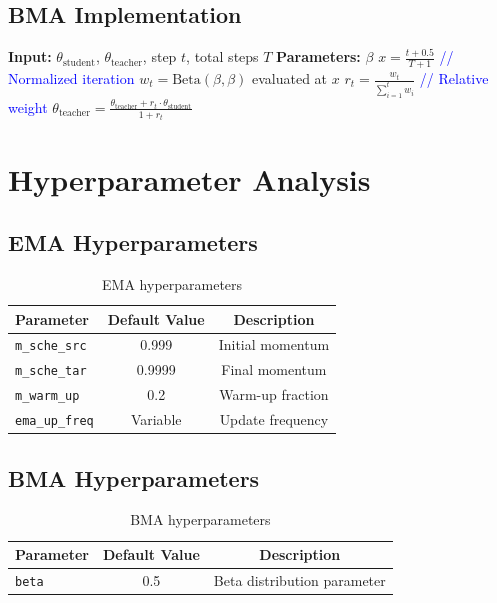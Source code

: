 \documentclass[11pt]{article}
\begin{document}
\subsection{BMA Implementation}

\begin{algorithm}
\caption{BMA Teacher Update}
\begin{algorithmic}[1]
\STATE \textbf{Input:} $\theta_{\text{student}}$, $\theta_{\text{teacher}}$, step $t$, total steps $T$
\STATE \textbf{Parameters:} $\beta$
\STATE 
\STATE $x = \frac{t + 0.5}{T + 1}$ \textcolor{blue}{// Normalized iteration}
\STATE $w_t = \text{Beta}(\beta, \beta)$ evaluated at $x$
\STATE $r_t = \frac{w_t}{\sum_{i=1}^{t} w_i}$ \textcolor{blue}{// Relative weight}
\STATE $\theta_{\text{teacher}} = \frac{\theta_{\text{teacher}} + r_t \cdot \theta_{\text{student}}}{1 + r_t}$
\end{algorithmic}
\end{algorithm}

\section{Hyperparameter Analysis}

\subsection{EMA Hyperparameters}

\begin{table}[h!]
\centering
\begin{tabular}{lcc}
\toprule
Parameter & Default Value & Description \\
\midrule
\texttt{m\_sche\_src} & 0.999 & Initial momentum \\
\texttt{m\_sche\_tar} & 0.9999 & Final momentum \\
\texttt{m\_warm\_up} & 0.2 & Warm-up fraction \\
\texttt{ema\_up\_freq} & Variable & Update frequency \\
\bottomrule
\end{tabular}
\caption{EMA hyperparameters}
\end{table}

\subsection{BMA Hyperparameters}

\begin{table}[h!]
\centering
\begin{tabular}{lcc}
\toprule
Parameter & Default Value & Description \\
\midrule
\texttt{beta} & 0.5 & Beta distribution parameter \\
\bottomrule
\end{tabular}
\caption{BMA hyperparameters}
\end{table}
\end{document}
